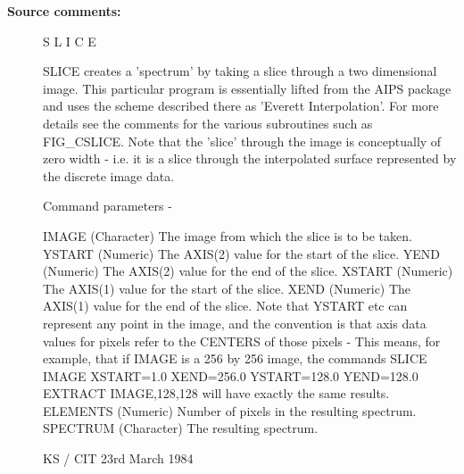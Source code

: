 \begin{description}
\item [\textbf{Source comments:}]
\begin{terminalv}
 S L I C E

 SLICE creates a 'spectrum' by taking a slice through a two
 dimensional image.  This particular program is essentially
 lifted from the AIPS package and uses the scheme described there
 as 'Everett Interpolation'.  For more details see the comments
 for the various subroutines such as FIG_CSLICE.  Note that the
 'slice' through the image is conceptually of zero width - i.e. it
 is a slice through the interpolated surface represented by the
 discrete image data.

 Command parameters -

 IMAGE     (Character) The image from which the slice is to be
           taken.
 YSTART    (Numeric) The AXIS(2) value for the start of the slice.
 YEND      (Numeric) The AXIS(2) value for the end of the slice.
 XSTART    (Numeric) The AXIS(1) value for the start of the slice.
 XEND      (Numeric) The AXIS(1) value for the end of the slice.
           Note that YSTART etc can represent any point in the
           image, and the convention is that axis data values
           for pixels refer to the CENTERS of those pixels -
           This means, for example, that if IMAGE is a 256 by 256
           image, the commands
           SLICE IMAGE XSTART=1.0 XEND=256.0 YSTART=128.0 YEND=128.0
           EXTRACT IMAGE,128,128   will have exactly the same
           results.
 ELEMENTS  (Numeric) Number of pixels in the resulting spectrum.
 SPECTRUM  (Character) The resulting spectrum.

                                           KS / CIT 23rd March 1984
\end{terminalv}
\end{description}

